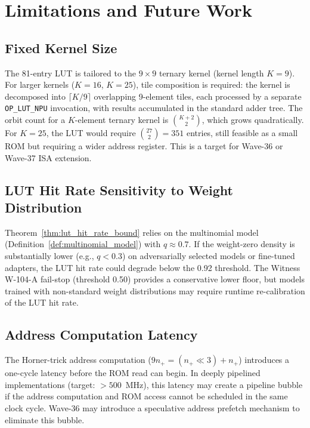 \section{Limitations and Future Work}
\label{sec:limitations}

\subsection{Fixed Kernel Size}

The 81-entry LUT is tailored to the $9 \times 9$ ternary kernel (kernel
length $K = 9$).  For larger kernels ($K = 16$, $K = 25$), tile composition
is required: the kernel is decomposed into $\lceil K/9 \rceil$ overlapping
9-element tiles, each processed by a separate \texttt{OP\_LUT\_NPU}
invocation, with results accumulated in the standard adder tree.  The
orbit count for a $K$-element ternary kernel is $\binom{K+2}{2}$, which
grows quadratically.  For $K = 25$, the LUT would require $\binom{27}{2} = 351$
entries, still feasible as a small ROM but requiring a wider address register.
This is a target for Wave-36 or Wave-37 ISA extension.

\subsection{LUT Hit Rate Sensitivity to Weight Distribution}

Theorem~\ref{thm:lut_hit_rate_bound} relies on the multinomial model
(Definition~\ref{def:multinomial_model}) with $q \approx 0.7$.  If the
weight-zero density is substantially lower (e.g., $q < 0.3$) on adversarially
selected models or fine-tuned adapters, the LUT hit rate could degrade below
the 0.92 threshold.  The Witness W-104-A fail-stop (threshold 0.50) provides
a conservative lower floor, but models trained with non-standard weight
distributions may require runtime re-calibration of the LUT hit rate.

\subsection{Address Computation Latency}

The Horner-trick address computation ($9 n_{+} = (n_{+} \ll 3) + n_{+}$)
introduces a one-cycle latency before the ROM read can begin.  In deeply
pipelined implementations (target: $> 500$~MHz), this latency may create
a pipeline bubble if the address computation and ROM access cannot be
scheduled in the same clock cycle.  Wave-36 may introduce a speculative
address prefetch mechanism to eliminate this bubble.

